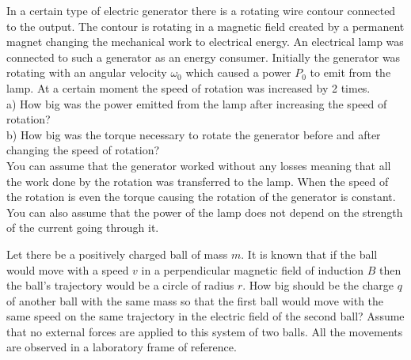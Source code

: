 \documentclass[11pt]{article}
\begin{document}
\probeng
In a certain type of electric generator there is a rotating wire contour connected to the output. The contour is rotating in a magnetic field created by a permanent magnet changing the mechanical work to electrical energy. An electrical lamp was connected to such a generator as an energy consumer. Initially the generator was rotating with an angular velocity $\omega_0$ which caused a power $P_0$ to emit from the lamp. At a certain moment the speed of rotation was increased by 2 times.\\
a) How big was the power emitted from the lamp after increasing the speed of rotation?\\
b) How big was the torque necessary to rotate the generator before and after changing the speed of rotation?\\
You can assume that the generator worked without any losses meaning that all the work done by the rotation was transferred to the lamp. When the speed of the rotation is even the torque causing the rotation of the generator is constant. You can also assume that the power of the lamp does not depend on the strength of the current going through it.
\probend
\bigskip


\probeng
Let there be a positively charged ball of mass $m$. It is known that if the ball would move with a speed $v$ in a perpendicular magnetic field of induction $B$ then the ball’s trajectory would be a circle of radius $r$. How big should be the charge $q$ of another ball with the same mass so that the first ball would move with the same speed on the same trajectory in the electric field of the second ball? Assume that no external forces are applied to this system of two balls. All the movements are observed in a laboratory frame of reference.
\probend
\bigskip

\end{document}
